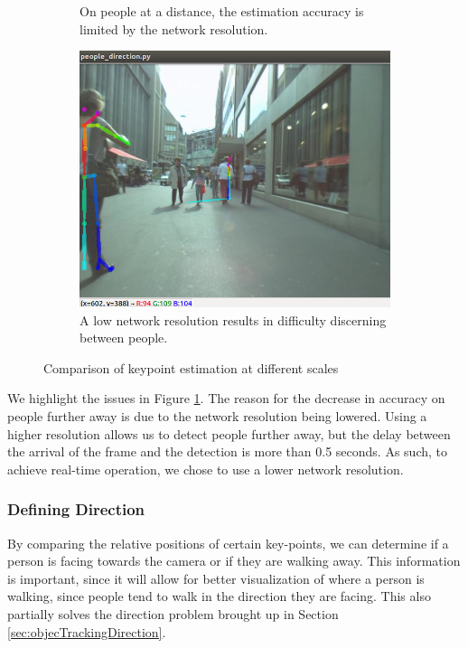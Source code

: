 \begin{figure}[ht]
\begin{subfigure}[b]{.32\textwidth}
		\caption{On people at a distance, the estimation accuracy is limited by the network resolution.}
	\end{subfigure}
	\hspace{\fill} 
	\begin{subfigure}[b]{.32\textwidth}
		\centering
		\includegraphics[width=1.0\linewidth]{img/chapter5_implementation/openposeKP2.png}
		\caption{A low network resolution results in difficulty discerning between people.}
	\end{subfigure}
	\vspace{-1\baselineskip}
	\begin{center}
		\caption{Comparison of keypoint estimation at different scales}
		\label{fig:openposeKP}
	\end{center}
		\vspace{-1.5\baselineskip}
\end{figure}

We highlight the issues in Figure \ref{fig:openposeKP}. The reason for the decrease in accuracy on people further away is due to the network resolution being lowered. Using a higher resolution allows us to detect people further away, but the delay between the arrival of the frame and the detection is more than 0.5 seconds. As such, to achieve real-time operation, we chose to use a lower network resolution.

\subsubsection{Defining Direction} \label{sec:keypointEstimate}
By comparing the relative positions of certain key-points, we can determine if a person is facing towards the camera or if they are walking away. This information is important, since it will allow for better visualization of where a person is walking, since people tend to walk in the direction they are facing. This also partially solves the direction problem brought up in Section \ref{sec:objecTrackingDirection}.

